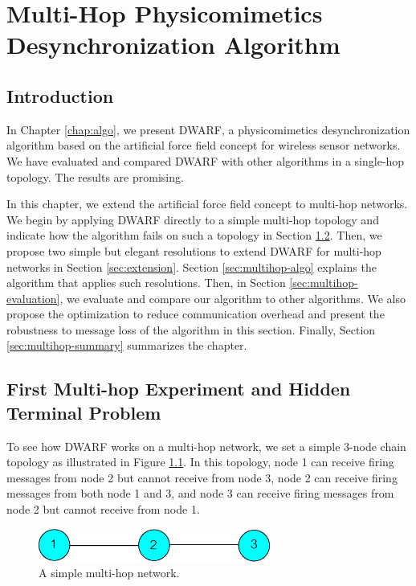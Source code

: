\chapter{Multi-Hop Physicomimetics Desynchronization Algorithm}
\label{chap:multihop}

\section{Introduction}
In Chapter \ref{chap:algo}, we present DWARF, a physicomimetics desynchronization algorithm based on the artificial force field concept for wireless sensor networks. We have evaluated and compared DWARF with other algorithms in a single-hop topology. The results are promising. 

In this chapter, we extend the artificial force field concept to multi-hop networks. We begin by applying DWARF directly to a simple multi-hop topology and indicate how the algorithm fails on such a topology in Section \ref{sec:hidden-terminal}. Then, we propose two simple but elegant resolutions to extend DWARF for multi-hop networks in Section \ref{sec:extension}. Section \ref{sec:multihop-algo} explains the algorithm that applies such resolutions. Then, in Section \ref{sec:multihop-evaluation}, we evaluate and compare our algorithm to other algorithms.
We also propose the optimization to reduce communication overhead and present the robustness to message loss of the algorithm in this section.
Finally, Section \ref{sec:multihop-summary} summarizes the chapter. 

\section{First Multi-hop Experiment and Hidden Terminal Problem}
\label{sec:hidden-terminal}
To see how DWARF works on a multi-hop network, we set a simple 3-node chain topology as illustrated in Figure \ref{fig:3nodes-chain}. In this topology, node 1 can receive firing messages from node 2 but cannot receive from node 3, node 2 can receive firing messages from both node 1 and 3, and node 3 can receive firing messages from node 2 but cannot receive from node 1.

\vspace{20pt}
\begin{figure}[!h]
\centering
\includegraphics[width=3in]{figure/3nodes-chain}
\caption{A simple multi-hop network.}
\label{fig:3nodes-chain}
\end{figure}

